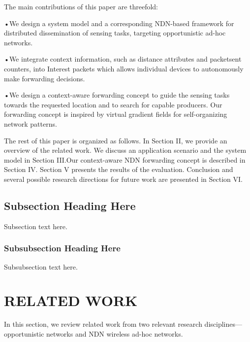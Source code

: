 \documentclass[10pt, conference, compsocconf]{IEEEtran}
\begin{document}
The main contributions of this paper are threefold:

•We design a system model and a corresponding NDN-based framework for distributed dissemination of sensing tasks, targeting opportunistic ad-hoc networks.

•We integrate context information, such as distance attributes and packetsent counters, into Interest packets which allows individual devices to autonomously make forwarding decisions.

•We design a context-aware forwarding concept to guide the sensing tasks towards the requested location and to search for capable producers.  Our  forwarding concept is inspired by virtual gradient ﬁelds for self-organizing network patterns.

The rest of this paper is organized as follows. In Section II, we provide an overview of the related work. We discuss an application scenario and the system model in Section III.Our context-aware NDN forwarding concept is described in Section IV. Section V presents the results of the evaluation. Conclusion and several possible research directions for future work are presented in Section VI.


\subsection{Subsection Heading Here}
Subsection text here.


\subsubsection{Subsubsection Heading Here}
Subsubsection text here.

\section{RELATED WORK}
In this section, we review related work from two relevant research disciplines—opportunistic networks and NDN wireless ad-hoc networks.
\end{document}
